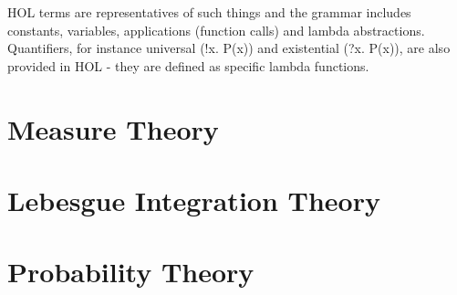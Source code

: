 

HOL terms are representatives of such things and the grammar includes constants, variables, applications (function calls) and lambda abstractions. Quantifiers, for instance universal (!x. P(x)) and existential (?x. P(x)), are also provided in HOL - they are defined as specific lambda functions.

\section{Measure Theory}

\section{Lebesgue Integration Theory}

\section{Probability Theory}

